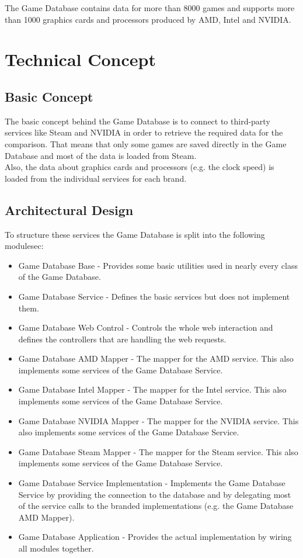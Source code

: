 \documentclass[12pt]{scrreprt}
\begin{document}
			The Game Database contains data for more than 8000 games and supports more than 1000 graphics cards and processors produced by AMD, Intel and NVIDIA.


		\section{Technical Concept}
			\label{sec:tb-concept_technical}

			\subsection{Basic Concept}
				\label{subsec:tb-concept_technical_basic}

				The basic concept behind the Game Database is to connect to third-party services like Steam and NVIDIA in order to retrieve the required data for the comparison. That means that only some games are saved directly in the Game Database and most of the data is loaded from Steam.
				\\
				Also, the data about graphics cards and processors (e.g. the clock speed) is loaded from the individual services for each brand.

			\subsection{Architectural Design}
				\label{subsec:tb-concept_technical_architectural-design}

				To structure these services the Game Database is split into the following modulesec:
				\begin{itemize}
					\item Game Database Base - Provides some basic utilities used in nearly every class of the Game Database.
					\item Game Database Service - Defines the basic services but does not implement them.
					\item Game Database Web Control - Controls the whole web interaction and defines the controllers that are handling the web requests.
					\item Game Database AMD Mapper - The mapper for the AMD service. This also implements some services of the Game Database Service.
					\item Game Database Intel Mapper - The mapper for the Intel service. This also implements some services of the Game Database Service.
					\item Game Database NVIDIA Mapper - The mapper for the NVIDIA service. This also implements some services of the Game Database Service.
					\item Game Database Steam Mapper - The mapper for the Steam service. This also implements some services of the Game Database Service.
					\item Game Database Service Implementation - Implements the Game Database Service by providing the connection to the database and by delegating most of the service calls to the branded implementations (e.g. the Game Database AMD Mapper).
					\item Game Database Application - Provides the actual implementation by wiring all modules together.
				\end{itemize}
\end{document}
